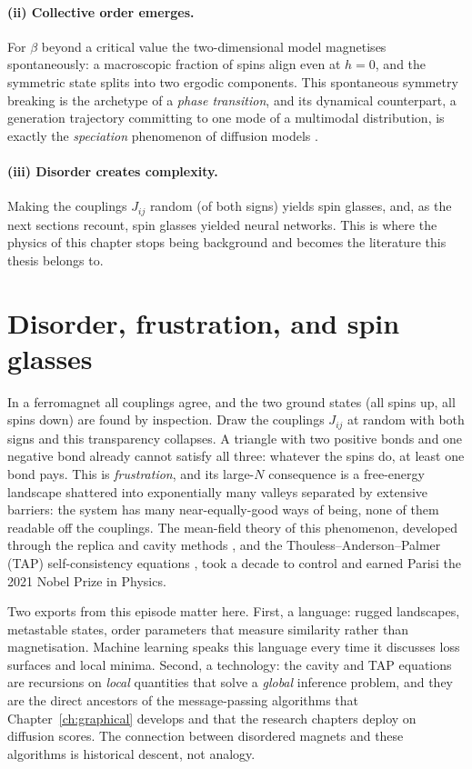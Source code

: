 \paragraph{(ii) Collective order emerges.} For $\beta$ beyond a critical
value the two-dimensional model magnetises spontaneously: a macroscopic
fraction of spins align even at $h = 0$, and the symmetric state splits
into two ergodic components. This spontaneous symmetry breaking is the
archetype of a \emph{phase transition}, and its dynamical counterpart, a
generation trajectory committing to one mode of a multimodal
distribution, is exactly the \emph{speciation} phenomenon of diffusion
models \citep{biroli2024dynamical, raya2023spontaneous}.

\paragraph{(iii) Disorder creates complexity.} Making the couplings
$J_{ij}$ random (of both signs) yields spin glasses, and, as the next
sections recount, spin glasses yielded neural networks. This is where the
physics of this chapter stops being background and becomes the
literature this thesis belongs to.

\section{Disorder, frustration, and spin glasses}\label{sec:spinglass}

In a ferromagnet all couplings agree, and the two ground states (all
spins up, all spins down) are found by inspection. Draw the couplings
$J_{ij}$ at random with both signs \citep{edwards1975theory,
sherrington1975solvable} and this transparency collapses. A triangle with
two positive bonds and one negative bond already cannot satisfy all
three: whatever the spins do, at least one bond pays. This is
\emph{frustration}, and its large-$N$ consequence is a free-energy
landscape shattered into exponentially many valleys separated by
extensive barriers: the system has many near-equally-good ways of being,
none of them readable off the couplings. The mean-field theory of this
phenomenon, developed through the replica and cavity methods
\citep{mezard1987spin}, and the Thouless--Anderson--Palmer (TAP)
self-consistency equations \citep{thouless1977solution}, took a decade to
control and earned Parisi the 2021 Nobel Prize in Physics.

Two exports from this episode matter here. First, a language: rugged
landscapes, metastable states, order parameters that measure similarity
rather than magnetisation. Machine learning speaks this language every
time it discusses loss surfaces and local minima. Second, a technology:
the cavity and TAP equations are recursions on \emph{local} quantities
that solve a \emph{global} inference problem, and they are the direct
ancestors of the message-passing algorithms \citep{mezard2009information,
zdeborova2016statistical, krzakala2024statphys} that
Chapter~\ref{ch:graphical} develops and that the research chapters deploy on
diffusion scores. The connection between disordered magnets and these
algorithms is historical descent, not analogy.

